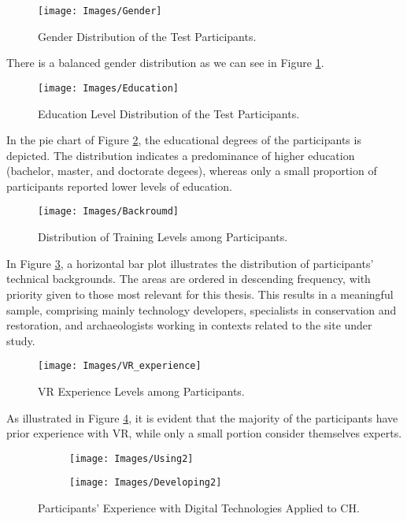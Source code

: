\begin{figure}[h!]
    \centering
    \texttt{[image: Images/Gender]}
    \caption{Gender Distribution of the Test Participants.} 
    \label{fig:gender}
\end{figure}

There is a balanced gender distribution as we can see in Figure \ref{fig:gender}.

\begin{figure}[h!]
    \centering
    \texttt{[image: Images/Education]}
    \caption{Education Level Distribution of the Test Participants.} 
    \label{fig:education}
\end{figure}

In the pie chart of Figure \ref{fig:education}, the educational degrees of the participants is depicted. 
The distribution indicates a predominance of higher education (bachelor, master, and doctorate degees), whereas only a small proportion of participants reported lower levels of education.


\begin{figure}[h!]
    \centering
    \texttt{[image: Images/Backroumd]}
    \caption{Distribution of Training Levels among Participants.} 
    \label{fig:background}
\end{figure}

In Figure \ref{fig:background}, a horizontal bar plot illustrates the distribution of participants’ technical backgrounds. 
The areas are ordered in descending frequency, with priority given to those most relevant for this thesis. 
This results in a meaningful sample, comprising mainly technology developers, specialists in conservation and restoration, and archaeologists working in contexts related to the site under study.

\begin{figure}[h!]
    \centering
    \texttt{[image: Images/VR\_experience]}
    \caption{\gls{VR} Experience Levels among Participants.} 
    \label{fig:VR_experience}
\end{figure}

As illustrated in Figure \ref{fig:VR_experience}, it is evident that the majority of the participants have prior experience with \gls{VR}, while only a small portion consider themselves experts.

\begin{figure}[h!]
  \centering
  \begin{subfigure}[b]{0.47\textwidth}
      \centering
      \texttt{[image: Images/Using2]}
      \label{fig:Using}
  \end{subfigure}
  \hfill
  \begin{subfigure}[b]{0.47\textwidth}
      \centering
      \texttt{[image: Images/Developing2]}
      \label{fig:Developing}
  \end{subfigure}
     \caption{Participants’ Experience with Digital Technologies Applied to \gls{CH}.}
     \label{fig:hertiage_techs}
\end{figure}
\FloatBarrier

